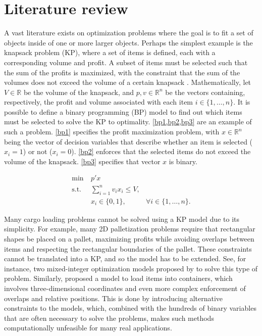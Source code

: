 \section{Literature review}

A vast literature exists on optimization problems where the goal is to fit a set of objects inside of one or more larger objects. Perhaps the simplest example is the knapsack problem (KP), where a set of items is defined, each with a corresponding volume and profit. A subset of items must be selected such that the sum of the profits is maximized, with the constraint that the sum of the volumes does not exceed the volume of a certain knapsack \cite{MARTELLO1987}. Mathematically, let $V \in \mathbb{R}$ be the volume of the knapsack, and $p, v \in \mathbb{R}^n$ be the vectors containing, respectively, the profit and volume associated with each item $i \in \{1,\dots,n\}$. It is possible to define a binary programming (BP) model to find out which items must be selected to solve the KP to optimality. \cref{bp1,bp2,bp3} are an example of such a problem. \cref{bp1} specifies the profit maximization problem, with $x \in \mathbb{R}^n$ being the vector of decision variables that describe whether an item is selected ($x_i = 1$) or not ($x_i = 0$). \cref{bp2} enforces that the selected items do not exceed the volume of the knapsack. \cref{bp3} specifies that vector $x$ is binary.

\begin{align}
    \min\ &p'x& \label{bp1}\\
    \text{s.t. } &\sum_{i=1}^{n}v_ix_i \leq V,&\label{bp2}\\
    &x_i \in \{0,1\},\ &\forall i \in \{1,\dots,n\}. \label{bp3}
\end{align}

Many cargo loading problems cannot be solved using a KP model due to its simplicity. For example, many 2D palletization problems require that rectangular shapes be placed on a pallet, maximizing profits while avoiding overlaps between items and respecting the rectangular boundaries of the pallet. These constraints cannot be translated into a KP, and so the model has to be extended. See, for instance, two mixed-integer optimization models proposed by \textcite{KALVELAGEN2021} to solve this type of problem. Similarly, \textcite{CHEN1995} proposed a model to load items into containers, which involves three-dimensional coordinates and even more complex enforcement of overlaps and relative positions. This is done by introducing alternative constraints to the models, which, combined with the hundreds of binary variables that are often necessary to solve the problems, makes such methods computationally unfeasible for many real applications.

